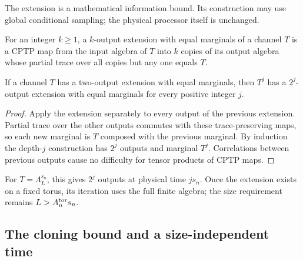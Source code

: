 The extension is a mathematical information bound. Its construction
may use global conditional sampling; the physical processor itself
is unchanged.

For an integer \(k\ge1\), a \(k\)-output extension with equal marginals of a channel \(T\) is a CPTP map from the input algebra of \(T\) into \(k\) copies of its output algebra whose partial trace over all copies but any one equals \(T\).

\begin{lemma}\label{f:iteration}
If a channel \(T\) has a two-output extension with equal marginals,
then \(T^j\) has a \(2^j\)-output extension with equal marginals
for every positive integer \(j\).
\end{lemma}
\begin{proof}
Apply the extension separately to every output of the previous
extension. Partial trace over the other outputs commutes with these
trace-preserving maps, so each new marginal is \(T\) composed with
the previous marginal. By induction the depth-\(j\) construction
has \(2^j\) outputs and marginal \(T^j\). Correlations between
previous outputs cause no difficulty for tensor products of CPTP
maps.
\end{proof}

For \(T=\Lambda_L^{s_n}\), this gives \(2^j\) outputs at physical
time \(js_n\). Once the extension exists on a fixed torus, its
iteration uses the full finite algebra; the size requirement remains
\(L>A^{\rm tor}_ns_n\).

\subsection{The cloning bound and a size-independent time}

